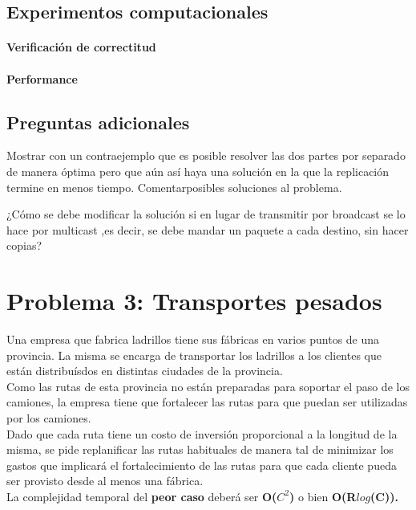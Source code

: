 \documentclass[a4paper, 10pt, twoside]{article}
\begin{document}
\subsection{Experimentos computacionales}

\paragraph{Verificación de correctitud}

\paragraph{Performance}

\subsection{Preguntas adicionales}
Mostrar con un contraejemplo que es posible resolver las dos partes por separado de manera óptima pero que aún así haya una solución en la que la replicación termine en menos tiempo. Comentarposibles soluciones al problema.


¿Cómo se debe modificar la solución si en lugar de transmitir por broadcast se lo hace por
multicast ,es decir, se debe mandar un paquete a cada destino, sin hacer copias?




\newpage

\section{Problema 3: Transportes pesados}

Una empresa que fabrica ladrillos tiene sus fábricas en varios puntos de una provincia. La misma se encarga de transportar los ladrillos a los clientes que están distribuísdos en distintas ciudades de la provincia.\\
Como las rutas de esta provincia no están preparadas para soportar el paso de los camiones, la empresa tiene que fortalecer las rutas para que puedan ser utilizadas por los camiones.\\
Dado que cada ruta tiene un costo de inversión proporcional a la longitud de la misma, se pide replanificar las rutas habituales de manera tal de minimizar los gastos que implicará el fortalecimiento de las rutas para que cada cliente pueda ser provisto desde al menos una fábrica.\\
La complejidad temporal del \textbf{peor caso} deberá ser \textbf{O($C^2$)} o bien \textbf{O(R$log$(C)).}
\end{document}

